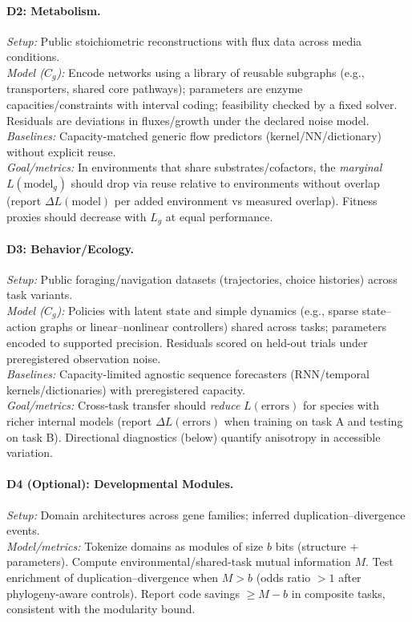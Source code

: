 \documentclass[11pt,a4paper]{article}
\begin{document}
\paragraph{D2: Metabolism.}
\emph{Setup:} Public stoichiometric reconstructions with flux data across media conditions.\\
\emph{Model (\(C_g\)):} Encode networks using a library of reusable subgraphs (e.g., transporters, shared core pathways); parameters are enzyme capacities/constraints with interval coding; feasibility checked by a fixed solver. Residuals are deviations in fluxes/growth under the declared noise model.\\
\emph{Baselines:} Capacity-matched generic flow predictors (kernel/NN/dictionary) without explicit reuse.\\
\emph{Goal/metrics:} In environments that share substrates/cofactors, the \emph{marginal} $L(\text{model}_g)$ should drop via reuse relative to environments without overlap (report $\Delta L(\text{model})$ per added environment vs measured overlap). Fitness proxies should decrease with $L_g$ at equal performance.

\paragraph{D3: Behavior/Ecology.}
\emph{Setup:} Public foraging/navigation datasets (trajectories, choice histories) across task variants.\\
\emph{Model (\(C_g\)):} Policies with latent state and simple dynamics (e.g., sparse state–action graphs or linear–nonlinear controllers) shared across tasks; parameters encoded to supported precision. Residuals scored on held-out trials under preregistered observation noise.\\
\emph{Baselines:} Capacity-limited agnostic sequence forecasters (RNN/temporal kernels/dictionaries) with preregistered capacity.\\
\emph{Goal/metrics:} Cross-task transfer should \emph{reduce} $L(\text{errors})$ for species with richer internal models (report $\Delta L(\text{errors})$ when training on task A and testing on task B). Directional diagnostics (below) quantify anisotropy in accessible variation.

\paragraph{D4 (Optional): Developmental Modules.}
\emph{Setup:} Domain architectures across gene families; inferred duplication–divergence events.\\
\emph{Model/metrics:} Tokenize domains as modules of size $b$ bits (structure + parameters). Compute environmental/shared-task mutual information $M$. Test enrichment of duplication–divergence when $M>b$ (odds ratio $>1$ after phylogeny-aware controls). Report code savings \(\ge M-b\) in composite tasks, consistent with the modularity bound.
\end{document}
